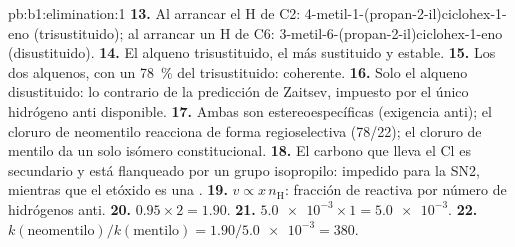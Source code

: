 \begin{solution}{pb:b1:elimination:1}
\textbf{13.} Al arrancar el H de C2: 4-metil-1-(propan-2-il)ciclohex-1-eno
(trisustituido); al arrancar un H de C6:
3-metil-6-(propan-2-il)ciclohex-1-eno (disustituido).
\textbf{14.} El alqueno trisustituido, el más sustituido y estable.
\textbf{15.} Los dos alquenos, con un \qty{78}{\percent} del
trisustituido: coherente.
\textbf{16.} Solo el alqueno disustituido: lo contrario de la predicción
de Zaitsev, impuesto por el único hidrógeno anti disponible.
\textbf{17.} Ambas son estereoespecíficas (exigencia anti); el cloruro de
neomentilo reacciona de forma regioselectiva (78/22); el cloruro de
mentilo da un solo isómero constitucional.
\textbf{18.} El carbono que lleva el Cl es secundario y está flanqueado
por un grupo isopropilo: impedido para la SN2, mientras que el etóxido es
una .
\textbf{19.} $v \propto x\,n_{\mathrm{H}}$: fracción de  reactiva por
número de hidrógenos anti.
\textbf{20.} $0.95 \times 2 = 1.90$.
\textbf{21.} $\num{5.0e-3} \times 1 = \num{5.0e-3}$.
\textbf{22.} \textbf{$k(\text{neomentilo})/k(\text{mentilo}) = 1.90/\num{5.0e-3}
= 380$}.
\end{solution}
